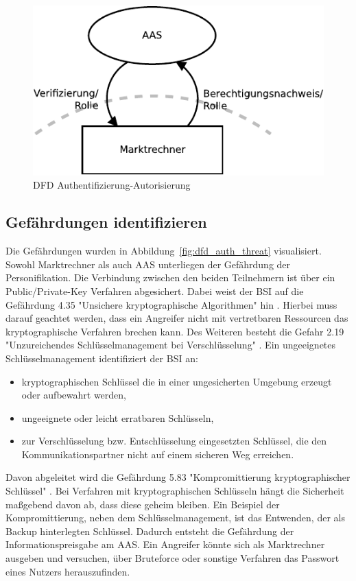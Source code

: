\documentclass[11pt,a4paper]{report}
\begin{document}
\begin{figure}[htbp]
\centering
\includegraphics[scale=1.1]{images/dfd_auth.pdf}
\caption{DFD Authentifizierung-Autorisierung}
\label{fig:dfd_auth}
\end{figure}

\subsection{Gefährdungen identifizieren}

Die Gefährdungen wurden in Abbildung~\ref{fig:dfd_auth_threat} visualisiert. Sowohl Marktrechner als auch AAS unterliegen der Gefährdung der Personifikation. Die Verbindung zwischen den beiden Teilnehmern ist über ein Public/Private-Key Verfahren abgesichert. Dabei weist der BSI auf die Gefährdung 4.35 "Unsichere kryptographische Algorithmen" hin \cite{bsi_g4035}. Hierbei muss darauf geachtet werden, dass ein Angreifer nicht mit vertretbaren Ressourcen das kryptographische Verfahren brechen kann. Des Weiteren besteht die Gefahr 2.19 "Unzureichendes Schlüsselmanagement bei Verschlüsselung" \cite{bsi_g2019}. Ein ungeeignetes Schlüsselmanagement identifiziert der BSI an:

\begin{itemize}
\item kryptographischen Schlüssel die in einer ungesicherten Umgebung erzeugt oder aufbewahrt werden,
\item ungeeignete oder leicht erratbaren Schlüsseln,
\item zur Verschlüsselung bzw. Entschlüsselung eingesetzten Schlüssel, die den Kommunikationspartner nicht auf einem sicheren Weg erreichen.
\end{itemize}

Davon abgeleitet wird die Gefährdung 5.83 "Kompromittierung kryptographischer Schlüssel" \cite{bsi_g5083}. Bei Verfahren mit kryptographischen Schlüsseln hängt die Sicherheit maßgebend davon ab, dass diese geheim bleiben. Ein Beispiel der Kompromittierung, neben dem Schlüsselmanagement, ist das Entwenden, der als Backup hinterlegten Schlüssel. Dadurch entsteht die Gefährdung der Informationspreisgabe am AAS. Ein Angreifer könnte sich als Marktrechner ausgeben und versuchen, über Bruteforce oder sonstige Verfahren das Passwort eines Nutzers herauszufinden.
\end{document}

